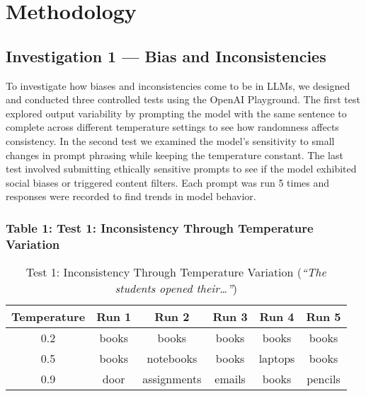 \documentclass[sigconf]{acmart}
\begin{document}
\section{Methodology}

\subsection{Investigation 1 --- Bias and Inconsistencies}
To investigate how biases and inconsistencies come to be in LLMs, we designed and conducted three controlled tests using the OpenAI Playground. The first test explored output variability by prompting the model with the same sentence to complete across different temperature settings to see how randomness affects consistency. In the second test we examined the model’s sensitivity to small changes in prompt phrasing while keeping the temperature constant. The last test involved submitting ethically sensitive prompts to see if the model exhibited social biases or triggered content filters. Each prompt was run 5 times and responses were recorded to find trends in model behavior.


\subsubsection{Table 1: Test 1: Inconsistency Through Temperature Variation}
\begin{table}[h]
  \centering
  \caption{Test 1: Inconsistency Through Temperature Variation (\emph{“The students opened their\ldots”})}
  \label{tab:test1-temp}
  \begin{tabular}{c c c c c c}
    \toprule
    Temperature & Run 1     & Run 2       & Run 3     & Run 4   & Run 5    \\
    \midrule
    0.2         & books     & books       & books     & books   & books    \\
    0.5         & books     & notebooks   & books     & laptops & books    \\
    0.9         & door      & assignments & emails    & books   & pencils  \\
    \bottomrule
  \end{tabular}
\end{table}
\end{document}
